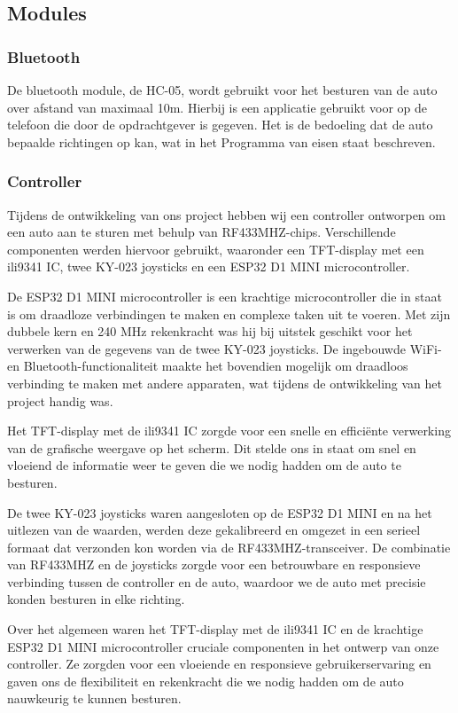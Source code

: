 \subsection{Modules}
\subsubsection{Bluetooth}
De bluetooth module, de HC-05, wordt gebruikt voor het besturen van de auto over afstand van maximaal 10m. Hierbij is een applicatie gebruikt voor op de telefoon die door de opdrachtgever is gegeven. Het is de bedoeling dat de auto bepaalde richtingen op kan, wat in het Programma van eisen staat beschreven. 
\subsubsection{Controller}
Tijdens de ontwikkeling van ons project hebben wij een controller ontworpen om een auto aan te sturen met behulp van \gls{RF433MHZ}-chips. Verschillende componenten werden hiervoor gebruikt, waaronder een \gls{TFT-display} met een \gls{ili9341}\cite{ILI3941} IC, twee KY-023 joysticks en een ESP32\cite{ESP32} D1 MINI \gls{microcontroller}.

De ESP32\cite{ESP32} D1 MINI \gls{microcontroller} is een krachtige \gls{microcontroller} die in staat is om draadloze verbindingen te maken en complexe taken uit te voeren. Met zijn dubbele kern en 240 MHz rekenkracht was hij bij uitstek geschikt voor het verwerken van de gegevens van de twee KY-023 joysticks. De ingebouwde WiFi- en \gls{Bluetooth}-functionaliteit maakte het bovendien mogelijk om draadloos verbinding te maken met andere apparaten, wat tijdens de ontwikkeling van het project handig was.

Het \gls{TFT-display} met de \gls{ili9341}\cite{ILI3941} IC zorgde voor een snelle en efficiënte verwerking van de grafische weergave op het scherm. Dit stelde ons in staat om snel en vloeiend de informatie weer te geven die we nodig hadden om de auto te besturen.

De twee KY-023\cite{KY023} joysticks waren aangesloten op de ESP32\cite{ESP32} D1 MINI en na het uitlezen van de waarden, werden deze gekalibreerd en omgezet in een serieel formaat dat verzonden kon worden via de \gls{RF433MHZ}-transceiver. De combinatie van \gls{RF433MHZ} en de joysticks zorgde voor een betrouwbare en responsieve verbinding tussen de controller en de auto, waardoor we de auto met precisie konden besturen in elke richting.

Over het algemeen waren het \gls{TFT-display} met de \gls{ili9341}\cite{ILI3941} IC en de krachtige ESP32\cite{ESP32} D1 MINI \gls{microcontroller} cruciale componenten in het ontwerp van onze controller. Ze zorgden voor een vloeiende en responsieve gebruikerservaring en gaven ons de flexibiliteit en rekenkracht die we nodig hadden om de auto nauwkeurig te kunnen besturen.

